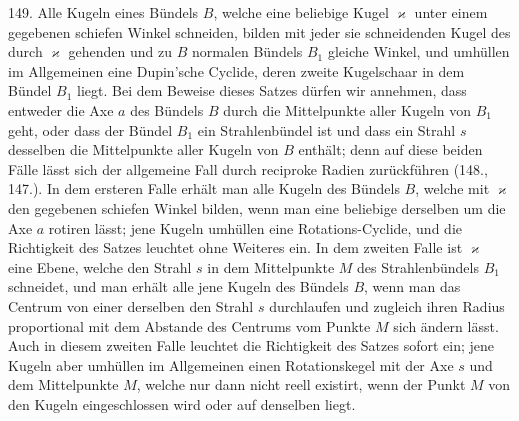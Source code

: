 149. Alle Kugeln eines B\"undels $B$, welche eine beliebige
Kugel $\varkappa$ unter einem gegebenen schiefen Winkel schneiden,
bilden mit jeder sie schneidenden Kugel des durch $\varkappa$
gehenden und zu $B$ normalen B\"undels $B_1$ gleiche Winkel,
und umh\"ullen im Allgemeinen eine Dupin'sche Cyclide, deren
zweite Kugelschaar in dem B\"undel $B_1$ liegt. Bei dem Beweise
dieses Satzes d\"urfen wir annehmen, dass entweder die
Axe $a$ des B\"undels $B$ durch die Mittelpunkte aller Kugeln
von $B_1$ geht, oder dass der B\"undel $B_1$ ein Strahlenb\"undel
ist und dass ein Strahl $s$ desselben die Mittelpunkte aller
Kugeln von $B$ enth\"alt; denn auf diese beiden F\"alle l\"asst
sich der allgemeine Fall durch reciproke Radien zur\"uckf\"uhren
(148., 147.). In dem ersteren Falle erh\"alt man alle
Kugeln des B\"undels $B$, welche mit $\varkappa$ den gegebenen schiefen
Winkel bilden, wenn man eine beliebige derselben um die
Axe $a$ rotiren l\"asst; jene Kugeln umh\"ullen eine Rotations-Cyclide,
und die Richtigkeit des Satzes leuchtet ohne Weiteres
ein. In dem zweiten Falle ist $\varkappa$ eine Ebene, welche den
Strahl $s$ in dem Mittelpunkte $M$ des Strahlenb\"undels $B_1$
schneidet, und man erh\"alt alle jene Kugeln des B\"undels $B$,
wenn man das Centrum von einer derselben den Strahl $s$
durchlaufen und zugleich ihren Radius proportional mit dem
Abstande des Centrums vom Punkte $M$ sich \"andern l\"asst.
Auch in diesem zweiten Falle leuchtet die Richtigkeit des
Satzes sofort ein; jene Kugeln aber umh\"ullen im Allgemeinen
einen Rotationskegel mit der Axe $s$ und dem Mittelpunkte
$M$, welche nur dann nicht reell existirt, wenn der Punkt $M$
von den Kugeln eingeschlossen wird oder auf denselben liegt.

